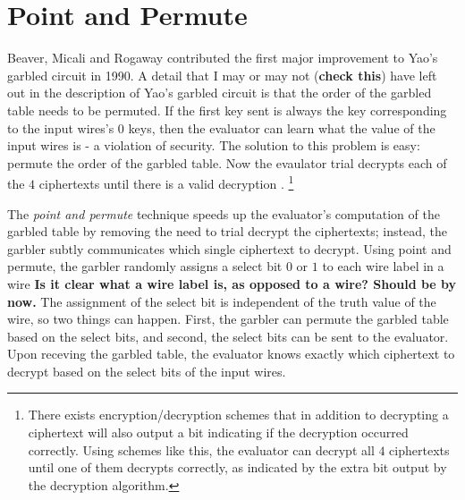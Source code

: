 \documentclass[12pt,twoside]{reedthesis}
\begin{document}

\section{Point and Permute}
Beaver, Micali and Rogaway contributed the first major improvement to Yao's garbled circuit in 1990.
A detail that I may or may not (\textbf{check this}) have left out in the description of Yao's garbled circuit is that the order of the garbled table needs to be permuted.
If the first key sent is always the key corresponding to the input wires's $0$ keys, then the evaluator can learn what the value of the input wires is - a violation of security.
The solution to this problem is easy: permute the order of the garbled table.
Now the evaulator trial decrypts each of the $4$ ciphertexts until there is a valid decryption .
\footnote{There exists encryption/decryption schemes that in addition to decrypting a ciphertext will also output a bit indicating if the decryption occurred correctly. Using schemes like this, the evaluator can decrypt all $4$ ciphertexts until one of them decrypts correctly, as indicated by the extra bit output by the decryption algorithm.}

The \textit{point and permute} technique speeds up the evaluator's computation of the garbled table by removing the need to trial decrypt the ciphertexts; instead, the garbler subtly communicates which single ciphertext to decrypt.
Using point and permute, the garbler randomly assigns a select bit $0$ or $1$ to each wire label in a wire \textbf{Is it clear what a wire label is, as opposed to a wire? Should be by now.}
The assignment of the select bit is independent of the truth value of the wire, so two things can happen. 
First, the garbler can permute the garbled table based on the select bits, and second, the select bits can be sent to the evaluator.
Upon receving the garbled table, the evaluator knows exactly which ciphertext to decrypt based on the select bits of the input wires.
\end{document}

